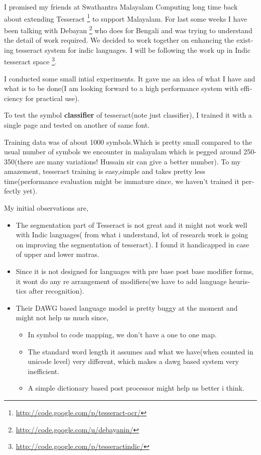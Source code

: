 \newpage
\begin{english}

I promised my friends at Swathantra Malayalam Computing long time back about extending Tesseract \footnote{\url{http://code.google.com/p/tesseract-ocr/}} to support Malayalam. For last some weeks I have been talking with Debayan \footnote{\url{http://code.google.com/u/debayanin/}} who does for Bengali and was trying to understand the detail of work required. We decided to work together on enhancing the existing tesseract system for indic languages. I will be following the work up in Indic tesseract space \footnote{\url{http://code.google.com/p/tesseractindic/}}.

I conducted some small intial experiments. It gave me an idea of what I have and what is to be done(I am looking forward to a high performance system with efficiency for practical use).

To test the symbol \textbf{classifier} of tesseract(note just classifier), I trained it with a single page and tested on another of same font.

Training data was of about 1000 symbols.Which is pretty small compared to the usual number of symbols we encounter in malayalam which is pegged around 250-350(there are many variations! Hussain sir can give a better number). To my amazement, tesseract training is easy,simple and takes pretty less time(performance evaluation might be immature since, we haven’t trained it perfectly yet).

My initial observations are,
\begin{itemize}
\item    The segmentation part of Tesseract is not great and it might not work well with Indic languages( from what i understand, lot of research work is going on improving the segmentation of tesseract). I found it handicapped in case of upper and lower matras.
\item    Since it is not designed for languages with pre base post base modifier forms, it wont do any re arrangement of modifiers(we have to add language heuristics after recognition).
\item    Their DAWG based language model is pretty buggy at the moment and might not help us much since,
    \begin{itemize}
        \item In symbol to code mapping, we don’t have a one to one map.
        \item The standard word length it assumes and what we have(when counted in unicode level) very different, which makes a dawg based system very inefficient.
        \item A simple dictionary based post processor might help us better i think.
    \end{itemize}
\end{itemize}


\end{english}

